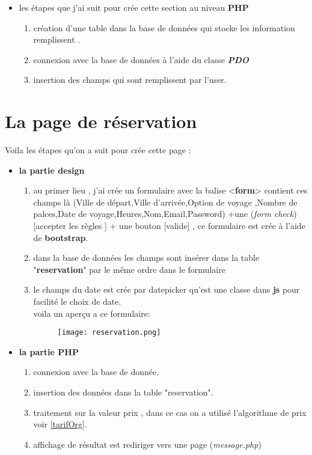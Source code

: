 \documentclass[a4paper,12pt]{report}
\begin{document}
\begin{itemize}
\item les étapes que j'ai suit pour crée cette section au niveau \textbf{PHP}
\begin{enumerate}
\item création d'une table dans la base de données qui stocke les information remplissent .
\item connexion avec la base de données à l'aide du classe \textit{\textbf{PDO}}
\item insertion des champs qui sont remplissent par l'user.
\end{enumerate}
\end{itemize}
\section*{La page de réservation}
Voila les étapes qu'on a suit pour crée cette page :
\begin{itemize}
	\item \textbf{la partie design}
	\begin{enumerate}
	\item au primer lieu , j'ai crée un formulaire avec la balise <\textbf{form}> contient ces champs là (Ville de départ,Ville d'arrivée,Option de voyage ,Nombre de palces,Date de voyage,Heures,Nom,Email,Password) +une (\textit{form check}) [accepter les règles ] + une bouton [valide] , ce formulaire est crée à l'aide de \textbf{bootstrap}.
	\item dans la base de données les champs sont insérer dans la table "\textbf{reservation}" par le même ordre dans le formulaire
	\item le champs du date est crée par datepicker qu'est une classe dans \textbf{js} pour facilité le choix de date. \\
	voila un aperçu a ce formulaire:
	\begin{figure}[H]
\begin{center}
\centering
\texttt{[image: reservation.png]}
\end{center}
\label{contact}
\end{figure}
	\end{enumerate}
	\item \textbf{la partie PHP}
	\begin{enumerate}
	\item connexion avec la base de donnée.
	\item insertion des données dans la table "reservation".
	\item traitement sur la valeur prix , dans ce cas on a utilisé l'algorithme de prix voir \ref{tarifOrg}.
	\item affichage de résultat est rediriger vers une page (\textit{message.php})
	\end{enumerate}
\end{itemize}
\end{document}
